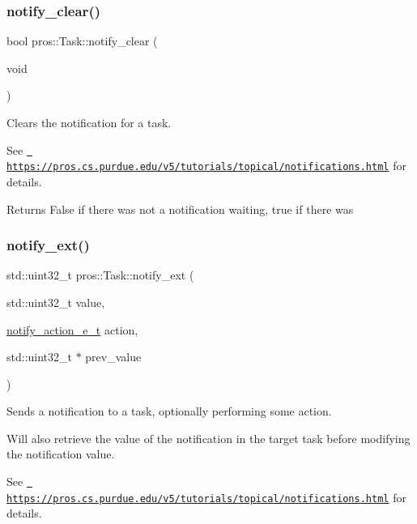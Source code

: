 \subsubsection{\texorpdfstring{notify\_clear()}{notify\_clear()}}
{\footnotesize\ttfamily bool pros\+::\+Task\+::notify\+\_\+clear (\begin{DoxyParamCaption}\item[{void}]{ }\end{DoxyParamCaption})}



Clears the notification for a task. 

See \href{https://pros.cs.purdue.edu/v5/tutorials/topical/notifications.html}{\texttt{ https\+://pros.\+cs.\+purdue.\+edu/v5/tutorials/topical/notifications.\+html}} for details.

\begin{DoxyReturn}{Returns}
False if there was not a notification waiting, true if there was 
\end{DoxyReturn}
\mbox{\label{classpros_1_1Task_add5bc6272aaa903fdf8ae6656d8ffddb}} 
\subsubsection{\texorpdfstring{notify\_ext()}{notify\_ext()}}
{\footnotesize\ttfamily std\+::uint32\+\_\+t pros\+::\+Task\+::notify\+\_\+ext (\begin{DoxyParamCaption}\item[{std\+::uint32\+\_\+t}]{value,  }\item[{\mbox{\hyperlink{rtos_8h_a42ea99b5e5d38da0b98154609cf6c570}{notify\+\_\+action\+\_\+e\+\_\+t}}}]{action,  }\item[{std\+::uint32\+\_\+t $\ast$}]{prev\+\_\+value }\end{DoxyParamCaption})}



Sends a notification to a task, optionally performing some action. 

Will also retrieve the value of the notification in the target task before modifying the notification value.

See \href{https://pros.cs.purdue.edu/v5/tutorials/topical/notifications.html}{\texttt{ https\+://pros.\+cs.\+purdue.\+edu/v5/tutorials/topical/notifications.\+html}} for details.


